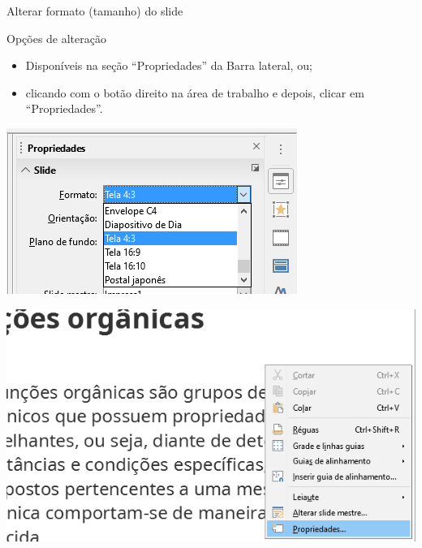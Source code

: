 \begin{frame}{Alterar formato (tamanho) do slide}
	\begin{block}{Opções de alteração}
		\begin{itemize}
			\item Disponíveis na seção “Propriedades” da Barra lateral, ou;
			\item clicando com o botão direito na área de trabalho e depois, clicar em “Propriedades”.
		\end{itemize}
	\end{block}

	\begin{minipage}{0.49\linewidth}
		\centering
		\includegraphics[width=1\linewidth]{Figuras/Ch05/fig16}
	\end{minipage}\hfill
	\begin{minipage}{0.49\linewidth}
		\centering
		\includegraphics[width=1\linewidth]{Figuras/Ch05/fig16.1}
	\end{minipage}
\end{frame}


